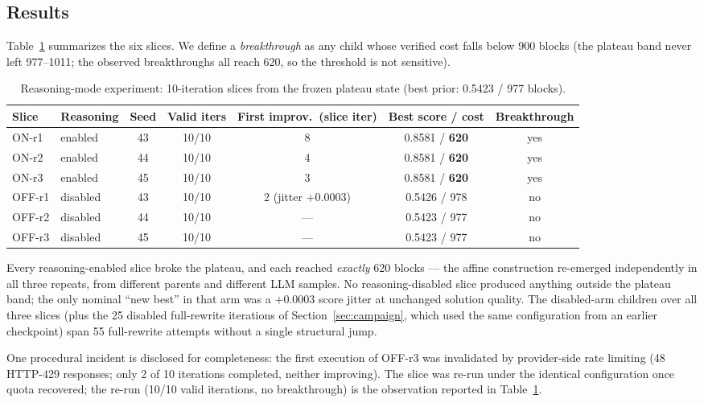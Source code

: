 \subsection{Results}

Table~\ref{tab:reasoning} summarizes the six slices. We define a
\emph{breakthrough} as any child whose verified cost falls below 900
blocks (the plateau band never left 977--1011; the observed
breakthroughs all reach 620, so the threshold is not sensitive).

\begin{table}
\caption{Reasoning-mode experiment: 10-iteration slices from the
frozen plateau state (best prior: 0.5423 / 977 blocks).}
\label{tab:reasoning}
\small
\begin{tabular}{llccccc}
\toprule
Slice & Reasoning & Seed & Valid iters & First improv.\ (slice iter)
& Best score / cost & Breakthrough \\
\midrule
ON-r1  & enabled  & 43 & 10/10 & 8 & 0.8581 / \textbf{620} & yes \\
ON-r2  & enabled  & 44 & 10/10 & 4 & 0.8581 / \textbf{620} & yes \\
ON-r3  & enabled  & 45 & 10/10 & 3 & 0.8581 / \textbf{620} & yes \\
OFF-r1 & disabled & 43 & 10/10 & 2 (jitter $+0.0003$)
                                   & 0.5426 / 978 & no \\
OFF-r2 & disabled & 44 & 10/10 & --- & 0.5423 / 977 & no \\
OFF-r3 & disabled & 45 & 10/10 & --- & 0.5423 / 977 & no \\
\bottomrule
\end{tabular}
\end{table}

Every reasoning-enabled slice broke the plateau, and each reached
\emph{exactly} 620 blocks --- the affine construction re-emerged
independently in all three repeats, from different parents and
different LLM samples. No reasoning-disabled slice produced anything
outside the plateau band; the only nominal ``new best'' in that arm
was a $+0.0003$ score jitter at unchanged solution quality. The
disabled-arm children over all three slices (plus the 25 disabled
full-rewrite iterations of Section~\ref{sec:campaign}, which used the
same configuration from an earlier checkpoint) span 55 full-rewrite
attempts without a single structural jump.

One procedural incident is disclosed for completeness: the first
execution of OFF-r3 was invalidated by provider-side rate limiting
(48 HTTP-429 responses; only 2 of 10 iterations completed, neither
improving). The slice was re-run under the identical configuration
once quota recovered; the re-run (10/10 valid iterations, no
breakthrough) is the observation reported in
Table~\ref{tab:reasoning}.


